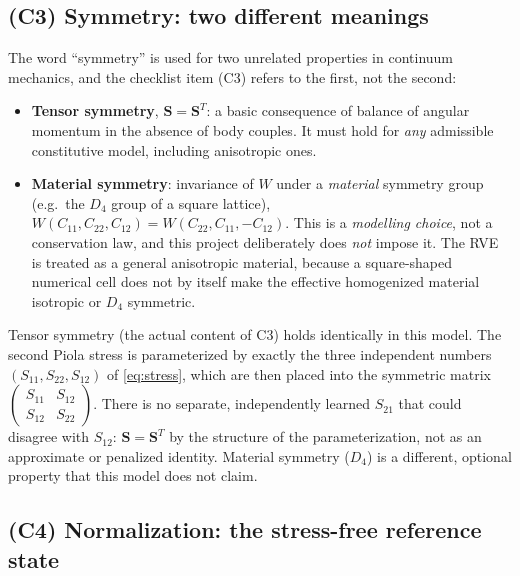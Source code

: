 \documentclass[10pt,a4paper]{article}
\begin{document}
\subsection{(C3) Symmetry: two different meanings}
\label{sec:c3}
The word ``symmetry'' is used for two unrelated properties in continuum
mechanics, and the checklist item (C3) refers to the first, not the
second:
\begin{itemize}
 \item \textbf{Tensor symmetry}, $\bm S=\bm S^T$: a basic
 consequence of balance of angular momentum in the absence of body
 couples.  It must hold for \emph{any} admissible constitutive model,
 including anisotropic ones.
 \item \textbf{Material symmetry}: invariance of $W$ under a
 \emph{material} symmetry group (e.g.\ the $D_4$ group of a square
 lattice), $W(C_{11},C_{22},C_{12})=W(C_{22},C_{11},-C_{12})$.  This is a
 \emph{modelling choice}, not a conservation law, and this project
 deliberately does \emph{not} impose it. The RVE is treated as a general
 anisotropic material, because a square-shaped numerical cell does not by
 itself make the effective homogenized material isotropic or $D_4$
 symmetric.
\end{itemize}
Tensor symmetry (the actual content of C3) holds identically in this
model. The second Piola stress is parameterized by exactly the three
independent numbers $(S_{11},S_{22},S_{12})$ of \eqref{eq:stress}, which
are then placed into the symmetric matrix
$\begin{pmatrix}S_{11}&S_{12}\\S_{12}&S_{22}\end{pmatrix}$.
There is no separate, independently learned $S_{21}$ that could disagree
with $S_{12}$: $\bm S=\bm S^T$ by the structure of the
parameterization, not as an approximate or penalized identity. Material
symmetry ($D_4$) is a different, optional property that this model does
not claim.

\subsection{(C4) Normalization: the stress-free reference state}
\label{sec:c4}
\end{document}
